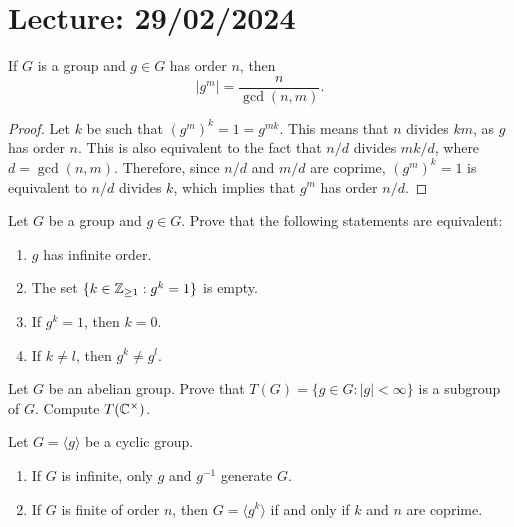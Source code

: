 \section{Lecture: 29/02/2024}

\begin{corollary}
        If $G$ is a group and $g\in G$ has order $n$, 
        then 
        \[
        |g^m|=\frac{n}{\gcd(n,m)}.
        \]
        \end{corollary}
        
\begin{proof}
        Let $k$ be such that $(g^m)^k=1=g^{mk}$. This means that $n$ divides $km$, as $g$ 
        has order $n$. This is also equivalent to the fact that 
        $n/d$ divides $mk/d$, where $d=\gcd(n,m)$. Therefore, since $n/d$ and $m/d$ 
        are coprime, $(g^m)^k=1$ is equivalent to  
        $n/d$ divides $k$, which implies that $g^m$ has order $n/
        d$.
\end{proof}
        
\begin{exercise}
        Let $G$ be a group and $g\in G$. Prove that the following statements are equivalent:
        \begin{enumerate}
        \item $g$ has infinite order. 
        \item The set $\{k\in\mathbb{Z}_{\geq1}:g^k=1\}$ is empty.
        \item If $g^k=1$, then $k=0$.
        \item If $k\ne l$, then $g^k\ne g^l$.
        \end{enumerate}
\end{exercise}

\begin{exercise}
        Let $G$ be an abelian group. Prove that 
        $T(G)=\{g\in G:|g|<\infty\}$ is a subgroup of $G$. Compute $T(\mathbb{C}^\times)$.
\end{exercise}
                
\begin{exercise}
        Let $G=\langle g\rangle$ be a cyclic group. 
        \begin{enumerate}
                \item If $G$ is infinite, only $g$ and $g^{-1}$ generate $G$.
                \item If $G$ is finite of order $n$, then 
                        $G=\langle g^k\rangle$ if and only if $k$ and $n$ are coprime.
        \end{enumerate}
\end{exercise}
                

